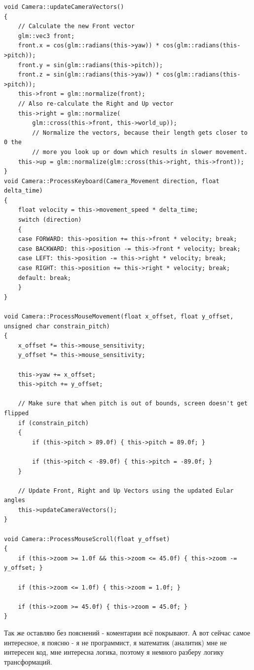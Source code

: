 \documentclass[12pt]{article}
\begin{document}
    \begin{verbatim}
void Camera::updateCameraVectors()
{
    // Calculate the new Front vector
    glm::vec3 front;
    front.x = cos(glm::radians(this->yaw)) * cos(glm::radians(this->pitch));
    front.y = sin(glm::radians(this->pitch));
    front.z = sin(glm::radians(this->yaw)) * cos(glm::radians(this->pitch));
    this->front = glm::normalize(front);
    // Also re-calculate the Right and Up vector
    this->right = glm::normalize(
        glm::cross(this->front, this->world_up)); 
        // Normalize the vectors, because their length gets closer to 0 the
        // more you look up or down which results in slower movement.
    this->up = glm::normalize(glm::cross(this->right, this->front));
}
void Camera::ProcessKeyboard(Camera_Movement direction, float delta_time)
{
    float velocity = this->movement_speed * delta_time;
    switch (direction)
    {
    case FORWARD: this->position += this->front * velocity; break;
    case BACKWARD: this->position -= this->front * velocity; break;
    case LEFT: this->position -= this->right * velocity; break;
    case RIGHT: this->position += this->right * velocity; break;
    default: break;
    }
}

void Camera::ProcessMouseMovement(float x_offset, float y_offset, unsigned char constrain_pitch)
{
    x_offset *= this->mouse_sensitivity;
    y_offset *= this->mouse_sensitivity;

    this->yaw += x_offset;
    this->pitch += y_offset;

    // Make sure that when pitch is out of bounds, screen doesn't get flipped
    if (constrain_pitch)
    {
        if (this->pitch > 89.0f) { this->pitch = 89.0f; }

        if (this->pitch < -89.0f) { this->pitch = -89.0f; }
    }

    // Update Front, Right and Up Vectors using the updated Eular angles
    this->updateCameraVectors();
}

void Camera::ProcessMouseScroll(float y_offset)
{
    if (this->zoom >= 1.0f && this->zoom <= 45.0f) { this->zoom -= y_offset; }

    if (this->zoom <= 1.0f) { this->zoom = 1.0f; }

    if (this->zoom >= 45.0f) { this->zoom = 45.0f; }
}
    \end{verbatim}
    Так же оставляю без пояснений - коментарии всё покрывают.
    А вот сейчас самое интересное, я поясню - я не программист,
    я математик (аналитик) мне не интересен код, мне интересна логика,
    поэтому я немного разберу логику трансформаций.
\end{document}
